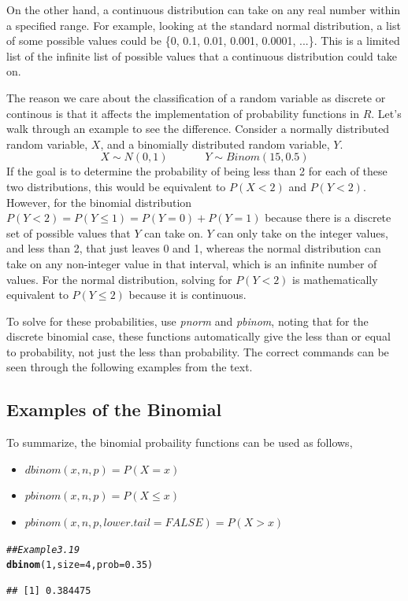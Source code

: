\documentclass{report}\usepackage[]{graphicx}\usepackage[]{color}
\makeatletter
\newcommand{\hlnum}[1]{\textcolor[rgb]{0.686,0.059,0.569}{#1}}%
\newcommand{\hlcom}[1]{\textcolor[rgb]{0.678,0.584,0.686}{\textit{#1}}}%
\newcommand{\hlstd}[1]{\textcolor[rgb]{0.345,0.345,0.345}{#1}}%
\newcommand{\hlkwc}[1]{\textcolor[rgb]{0.333,0.667,0.333}{#1}}%
\newcommand{\hlkwd}[1]{\textcolor[rgb]{0.737,0.353,0.396}{\textbf{#1}}}%
\newenvironment{kframe}{%
 \def\at@end@of@kframe{}%
 \ifinner\ifhmode%
  \def\at@end@of@kframe{\end{minipage}}%
  \begin{minipage}{\columnwidth}%
 \fi\fi%
 \def\FrameCommand##1{\hskip\@totalleftmargin \hskip-\fboxsep
 \colorbox{shadecolor}{##1}\hskip-\fboxsep
     \hskip-\linewidth \hskip-\@totalleftmargin \hskip\columnwidth}%
 \MakeFramed {\advance\hsize-\width
   \@totalleftmargin\z@ \linewidth\hsize
   \@setminipage}}%
 {\par\unskip\endMakeFramed%
 \at@end@of@kframe}
\newenvironment{knitrout}{}{} %
\makeatother
\begin{document}
On the other hand, a continuous distribution can take on any real number within a specified range.  For example, looking at the standard normal distribution, a list of some possible values could be \{0, 0.1, 0.01, 0.001, 0.0001, ...\}.  This is a limited list of the infinite list of possible values that a continuous distribution could take on.  

The reason we care about the classification of a random variable as discrete or continous is that it affects the implementation of probability functions in $R$.  Let's walk through an example to see the difference.  Consider a normally distributed random variable, $X$, and a binomially distributed random variable, $Y$. 
\[ X \sim N(0,1) \; \; \; \; \; \; \; \; \; \; \; \;  Y \sim Binom(15,0.5) \]
If the goal is to determine the probability of being less than 2 for each of these two distributions, this would be equivalent to $P(X < 2)$ and $P(Y < 2)$.  However, for the binomial distribution $P(Y<2) = P(Y \leq 1) = P(Y=0) + P(Y=1)$ because there is a discrete set of possible values that $Y$ can take on.  $Y$ can only take on the integer values, and less than 2, that just leaves 0 and 1, whereas the normal distribution can take on any non-integer value in that interval, which is an infinite number of values.  For the normal distribution, solving for $P(Y<2)$ is mathematically equivalent to $P(Y \leq 2)$ because it is continuous.  

To solve for these probabilities, use \textit{pnorm} and \textit{pbinom}, noting that for the discrete binomial case, these functions automatically give the less than or equal to probability, not just the less than probability.  The correct commands can be seen through the following examples from the text. 
\subsection{Examples of the Binomial}
\vspace{0.5cm}
To summarize, the binomial probaility functions can be used as follows, 
\begin{itemize} 
\item $dbinom(x,n,p) = P(X = x)$ 
\item $pbinom(x,n,p) = P(X \leq x)$ 
\item $pbinom(x,n,p, lower.tail = FALSE) = P(X > x)$ 
\end{itemize} 

\begin{knitrout}
\color{fgcolor}\begin{kframe}
\begin{alltt}
\hlcom{## Example 3.19 }
\hlkwd{dbinom}\hlstd{(}\hlnum{1}\hlstd{,} \hlkwc{size} \hlstd{=} \hlnum{4}\hlstd{,} \hlkwc{prob} \hlstd{=} \hlnum{0.35}\hlstd{)}
\end{alltt}
\begin{verbatim}
## [1] 0.384475
\end{verbatim}
\end{kframe}
\end{knitrout}
\end{document}
